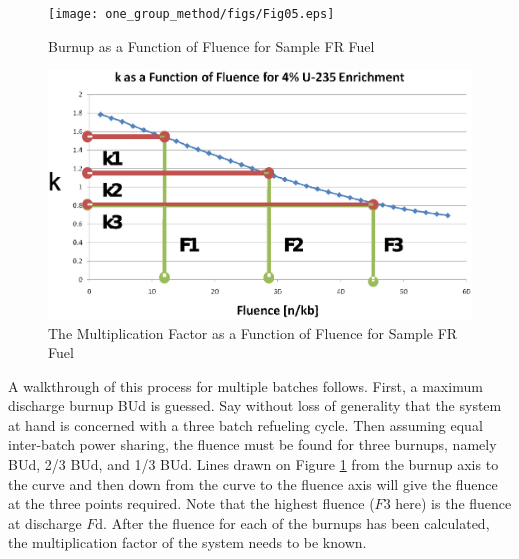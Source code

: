 \begin{figure}[htbp]
\caption{Burnup as a Function of Fluence for Sample FR Fuel}
\label{1g_fig05}
\begin{center}
\texttt{[image: one\_group\_method/figs/Fig05.eps]}
\end{center}
\end{figure}

\begin{figure}[htbp]
\caption{The Multiplication Factor as a Function of Fluence for Sample FR Fuel}
\label{1g_fig06}
\begin{center}
\includegraphics[scale=0.5]{one_group_method/figs/Fig06.eps}
\end{center}
\end{figure}

A walkthrough of this process for multiple batches follows.  First, a maximum 
discharge burnup BUd is guessed.  Say without loss of generality that the system at hand is 
concerned with a three batch refueling cycle.  Then assuming equal inter-batch power sharing, 
the fluence must be found for three burnups, namely BUd, 2/3 BUd, and 1/3 BUd.   Lines drawn on 
Figure \ref{1g_fig05} from the burnup axis to the curve and then down from the curve to the fluence 
axis will give the fluence at the three points required.  Note that the highest fluence ($F3$ here) 
is the fluence at discharge $F\mbox{d}$.  After the fluence for each of the burnups has been calculated, 
the multiplication factor of the system needs to be known. 

